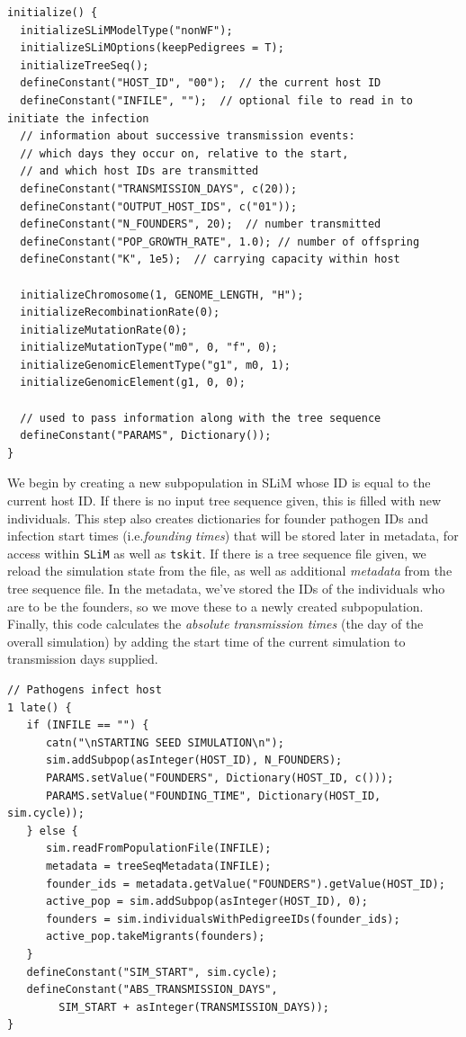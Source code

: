 \documentclass[12pt]{article}
\newcommand{\tskit}[0]{\texttt{tskit}\xspace}
\newcommand{\slim}[0]{\texttt{SLiM}\xspace}
\newcommand*{\ie}{i.e.\xcomma}
\begin{document}
\begin{lstlisting}[language=slim, style=slimstyle, breaklines=true]
initialize() {
  initializeSLiMModelType("nonWF");
  initializeSLiMOptions(keepPedigrees = T);
  initializeTreeSeq();
  defineConstant("HOST_ID", "00");  // the current host ID
  defineConstant("INFILE", "");  // optional file to read in to initiate the infection
  // information about successive transmission events:
  // which days they occur on, relative to the start,
  // and which host IDs are transmitted
  defineConstant("TRANSMISSION_DAYS", c(20));
  defineConstant("OUTPUT_HOST_IDS", c("01"));
  defineConstant("N_FOUNDERS", 20);  // number transmitted
  defineConstant("POP_GROWTH_RATE", 1.0); // number of offspring
  defineConstant("K", 1e5);  // carrying capacity within host
  
  initializeChromosome(1, GENOME_LENGTH, "H");
  initializeRecombinationRate(0);
  initializeMutationRate(0);
  initializeMutationType("m0", 0, "f", 0);
  initializeGenomicElementType("g1", m0, 1);
  initializeGenomicElement(g1, 0, 0);

  // used to pass information along with the tree sequence
  defineConstant("PARAMS", Dictionary());
}
\end{lstlisting}

We begin by creating a new subpopulation in SLiM whose ID is equal to the current host ID.
If there is no input tree sequence given,
this is filled with new individuals.
This step also creates dictionaries for founder pathogen IDs and infection start times (\ie \textit{founding times})
that will be stored later in metadata, for access within \slim as well as \tskit.
If there is a tree sequence file given,
we reload the simulation state from the file,
as well as additional \emph{metadata} from the tree sequence file.
In the metadata, we've stored the IDs of the individuals who are to be the founders,
so we move these to a newly created subpopulation.
Finally, this code
calculates the \textit{absolute transmission times} (the day of the overall simulation) by adding the start time of the current simulation to transmission days supplied.
\begin{lstlisting}[language=slim, style=slimstyle, breaklines=true]
// Pathogens infect host
1 late() {
   if (INFILE == "") {
      catn("\nSTARTING SEED SIMULATION\n");
      sim.addSubpop(asInteger(HOST_ID), N_FOUNDERS);
      PARAMS.setValue("FOUNDERS", Dictionary(HOST_ID, c()));
      PARAMS.setValue("FOUNDING_TIME", Dictionary(HOST_ID, sim.cycle));
   } else {
      sim.readFromPopulationFile(INFILE);
      metadata = treeSeqMetadata(INFILE);
      founder_ids = metadata.getValue("FOUNDERS").getValue(HOST_ID);
      active_pop = sim.addSubpop(asInteger(HOST_ID), 0);
      founders = sim.individualsWithPedigreeIDs(founder_ids);
      active_pop.takeMigrants(founders);
   }
   defineConstant("SIM_START", sim.cycle);		
   defineConstant("ABS_TRANSMISSION_DAYS",
        SIM_START + asInteger(TRANSMISSION_DAYS));
}
\end{lstlisting}
\end{document}
